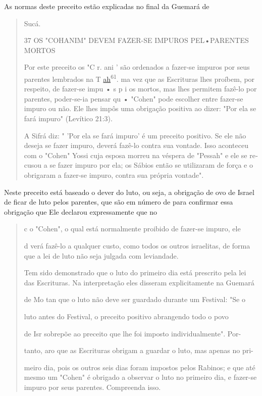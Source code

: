 As normas deste preceito estão explicadas no final da Guemará de

\begin{quote}
Sucá.

37 OS "COHANIM" DEVEM FAZER-SE IMPUROS PEL•PARENTES MORTOS

Por este preceito os "C r. ani ' são ordenados a fazer-se impuros por
seus parentes lembrados na T
{\href{http://ah61.ma}{ah}\textsuperscript{61}. ma} vez que as
Escrituras lhes proí­bem, por respeito, de fazer-se impu • s p i os
mortos, mas lhes permitem fazê-lo por parentes, poder-se-ia pensar qu •
"Cohen" pode escolher entre fazer-se impuro ou não. Ele lhes impôs uma
obrigação positiva ao dizer: "Por ela se fará impuro" (Levítico 21:3).

A Sifrá diz: " 'Por ela se fará impuro' é um preceito positivo. Se ele
não deseja se fazer impuro, deverá fazê-lo contra sua vontade. Isso
aconteceu com o "Cohen" Yossi cuja esposa morreu na véspera de "Pessah"
e ele se re­cusou a se fazer impuro por ela; os Sábios então se
utilizaram de força e o obri­garam a fazer-se impuro, contra sua própria
vontade".
\end{quote}

Neste preceito está baseado o dever do luto, ou seja, a obrigação de ovo
de Israel de ficar de luto pelos parentes, que são em número de para
confirmar essa obrigação que Ele declarou expressamente que no

\begin{quote}
c o "Cohen", o qual está normalmente proibido de fazer-se impuro, ele

d verá fazê-lo a qualquer custo, como todos os outros israelitas, de
forma que a lei de luto não seja julgada com leviandade.

Tem sido demonstrado que o luto do primeiro dia está prescrito pe­la lei
das Escrituras. Na interpretação eles disseram explicitamente na Guemará

de Mo tan que o luto não deve ser guardado durante um Festival: "Se o

luto antes do Festival, o preceito positivo abrangendo todo o povo

de Isr sobrepõe ao preceito que lhe foi imposto individualmente". Por-

tanto, aro que as Escrituras obrigam a guardar o luto, mas apenas no
pri-

meiro dia, pois os outros seis dias foram impostos pelos Rabinos; e que
até mes­mo um "Cohen" é obrigado a observar o luto no primeiro dia, e
fazer-se impu­ro por seus parentes. Compreenda isso.
\end{quote}

